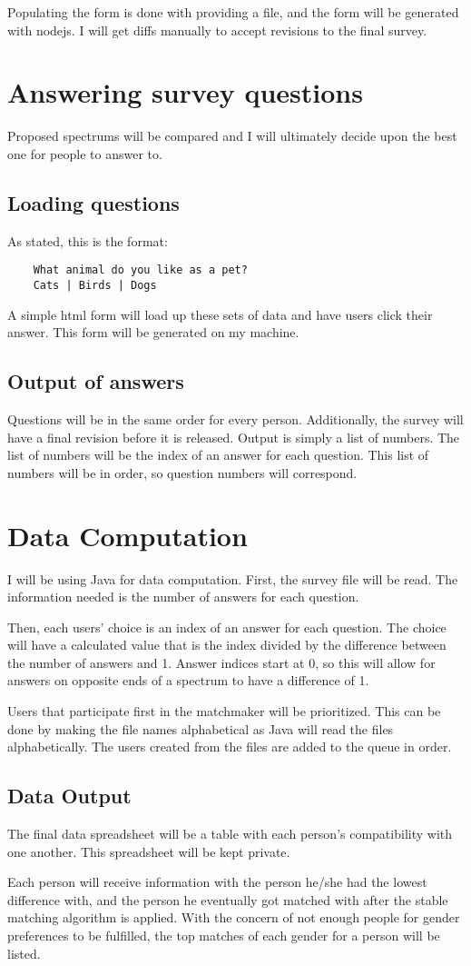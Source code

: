 \documentclass[12pt]{article}
\begin{document}
Populating the form is done with providing a file, and the form will be
generated with nodejs. I will get diffs manually to accept revisions to the
final survey.

\section{Answering survey questions}
Proposed spectrums will be compared and I will ultimately decide upon the best
one for people to answer to.

\subsection{Loading questions}
As stated, this is the format:
\begin{verbatim}
    What animal do you like as a pet?
    Cats | Birds | Dogs
\end{verbatim}

A simple html form will load up these sets of data and have users click their
answer. This form will be generated on my machine.

\subsection{Output of answers}
Questions will be in the same order for every person. Additionally, the survey
will have a final revision before it is released. Output is simply a list of
numbers. The list of numbers will be the index of an answer for each question.
This list of numbers will be in order, so question numbers will correspond.

\section{Data Computation}
I will be using Java for data computation.
First, the survey file will be read. The information needed is the number of
answers for each question.

Then, each users' choice is an index of an answer for each question. The choice
will have a calculated value that is the index divided by the difference between
the number of answers and 1. Answer indices start at 0, so this will allow for
answers on opposite ends of a spectrum to have a difference of 1.

Users that participate first in the matchmaker will be prioritized. This can be
done by making the file names alphabetical as Java will read the files
alphabetically. The users created from the files are added to the queue in
order.

\subsection{Data Output}
The final data spreadsheet will be a table with each person's compatibility with
one another. This spreadsheet will be kept private.

Each person will receive information with the person he/she had the lowest
difference with, and the person he eventually got matched with after the stable
matching algorithm is applied. With the concern of not enough people for gender
preferences to be fulfilled, the top matches of each gender for a person will
be listed.
\end{document}

